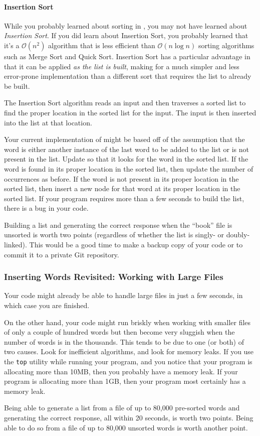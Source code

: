 \paragraph{Insertion Sort}

While you probably learned about sorting in \cstwo, you may not have learned about \textit{Insertion Sort}.
If you did learn about Insertion Sort, you probably learned that it's a $\mathcal{O}(n^2)$ algorithm that is less efficient than $\mathcal{O}(n \log n)$ sorting algorithms such as Merge Sort and Quick Sort.
Insertion Sort has a particular advantage in that it can be applied \textit{as the list is built}, making for a much simpler and less error-prone implementation than a different sort that requires the list to already be built.

The Insertion Sort algorithm reads an input and then traverses a sorted list to find the proper location in the sorted list for the input.
The input is then inserted into the list at that location.

Your current implementation of  might be based off of the assumption that the word is either another instance of the last word to be added to the list or is not present in the list.
Update  so that it looks for the word in the sorted list.
If the word is found in its proper location in the sorted list, then update the number of occurrences as before.
If the word is not present in its proper location in the sorted list, then insert a new node for that word at its proper location in the sorted list.
If your program requires more than a few seconds to build the list, there is a bug in your code.

Building a list and generating the correct response when the ``book'' file is unsorted is worth two points (regardless of whether the list is singly- or doubly-linked).
This would be a good time to make a backup copy of your code or to commit it to a private Git repository.

\subsubsection{Inserting Words Revisited: Working with Large Files}

Your code might already be able to handle large files in just a few seconds, in which case you are finished.

On the other hand, your code might run briskly when working with smaller files of only a couple of hundred words but then become very sluggish when the number of words is in the thousands.
This tends to be due to one (or both) of two causes.
Look for inefficient algorithms, and look for memory leaks.
If you use the \texttt{top} utility while running your program, and you notice that your program is allocating more than 10MB, then you probably have a memory leak.
If your program is allocating more than 1GB, then your program most certainly has a memory leak.

Being able to generate a list from a file of up to 80,000 pre-sorted words and generating the correct response, all within 20 seconds, is worth two points.
Being able to do so from a file of up to 80,000 unsorted words is worth another point.
